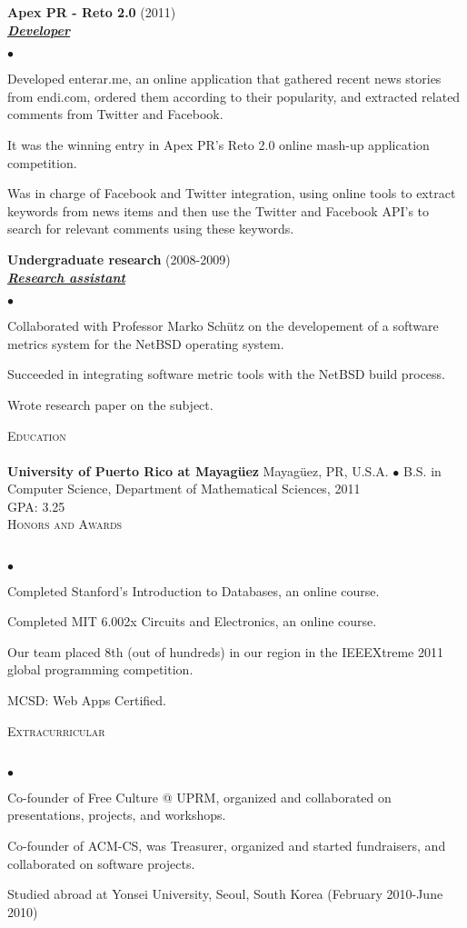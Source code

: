 \documentclass{article}
\newcommand{\lineunder}{\vspace*{-8pt} \\ \hspace*{-18pt} \hrulefill \\}
\newcommand{\header}[1]{{\hspace*{-15pt}\vspace*{6pt} \textsc{#1}} \vspace*{-6pt} \lineunder}
\newcommand{\employer}[3]{{ \textbf{#1} (#2)\\ \underline{\textbf{\emph{#3}}}\\  }}
\newenvironment{achievements}{\begin{list}{$\bullet$}{\topsep 0pt \itemsep -2pt}}{\vspace*{4pt}\end{list}}
\newcommand{\school}[4]{
 \textbf{#1} #2 $\bullet$ #3\\
 #4 \\
}
\begin{document}
\employer{Apex PR - Reto 2.0}{2011}{Developer}
	\begin{achievements}
	\item Developed enterar.me, an online application that gathered recent news stories from endi.com, ordered them according to their popularity, and extracted related comments from Twitter and Facebook.	
	\item It was the winning entry in Apex PR's Reto 2.0 online mash-up application competition.
	\item Was in charge of Facebook and Twitter integration, using online tools to extract keywords from news items and then use the Twitter and Facebook API's to search for relevant comments using these keywords.
	\end{achievements}

\employer{Undergraduate research}{2008-2009}{Research assistant}
	\begin{achievements}
	\item Collaborated with Professor Marko Sch\"{u}tz on the developement of a software metrics system for the NetBSD operating system.
	\item Succeeded in integrating software metric tools with the NetBSD build process.
	\item Wrote research paper on the subject.
	\end{achievements}

\header{Education}

\school{University of Puerto Rico at Mayag\"{u}ez}{Mayag\"{u}ez, PR, U.S.A.}{B.S. in Computer Science, Department of Mathematical Sciences, 2011}
{GPA: 3.25}

\header{Honors and Awards}
\begin{achievements}
\item Completed Stanford's Introduction to Databases, an online course.
\item Completed MIT 6.002x Circuits and Electronics, an online course.
\item Our team placed 8th (out of hundreds) in our region in the IEEEXtreme 2011 global programming competition.
\item MCSD: Web Apps Certified.
\end{achievements}


\header{Extracurricular}
\begin{achievements}
\item Co-founder of Free Culture @ UPRM, organized and collaborated on presentations, projects, and workshops.
\item Co-founder of ACM-CS, was Treasurer, organized and started fundraisers, and collaborated on software projects.
\item Studied abroad at Yonsei University, Seoul, South Korea (February 2010-June 2010)
\end{achievements}
\end{document}
